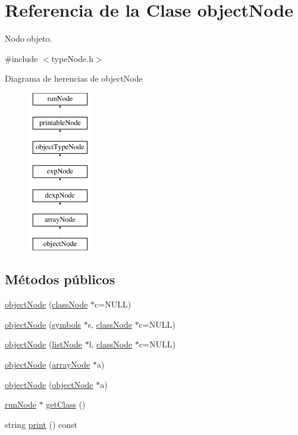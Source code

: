 \hypertarget{classobjectNode}{\section{Referencia de la Clase object\-Node}
\label{classobjectNode}
}


Nodo objeto.  




{\ttfamily \#include $<$type\-Node.\-h$>$}

Diagrama de herencias de object\-Node\begin{figure}[H]
\begin{center}
\leavevmode
\includegraphics[height=7.000000cm]{classobjectNode}
\end{center}
\end{figure}
\subsection*{Métodos públicos}
\begin{DoxyCompactItemize}
\item 
\hyperlink{classobjectNode_a924c50a260e1e237d2f878ff1bd0841d}{object\-Node} (\hyperlink{classclassNode}{class\-Node} $\ast$c=N\-U\-L\-L)
\item 
\hyperlink{classobjectNode_a10c1b39302a06372c2bace771503d716}{object\-Node} (\hyperlink{classsymbolsTable}{symbols} $\ast$s, \hyperlink{classclassNode}{class\-Node} $\ast$c=N\-U\-L\-L)
\item 
\hyperlink{classobjectNode_a4dbc45b00f1d165aabfdcb11d392209d}{object\-Node} (\hyperlink{classlistNode}{list\-Node} $\ast$l, \hyperlink{classclassNode}{class\-Node} $\ast$c=N\-U\-L\-L)
\item 
\hyperlink{classobjectNode_af455d01c22c12c41a7623212658f0a1b}{object\-Node} (\hyperlink{classarrayNode}{array\-Node} $\ast$a)
\item 
\hyperlink{classobjectNode_aefa62a54f0a0b568c864d17cad540a69}{object\-Node} (\hyperlink{classobjectNode}{object\-Node} $\ast$a)
\item 
\hyperlink{classrunNode}{run\-Node} $\ast$ \hyperlink{classobjectNode_a09303f23cd355cf6c404db07f0b4428c}{get\-Class} ()
\item 
string \hyperlink{classobjectNode_a6e191a70f60856612791b319b62461f9}{print} () const 
\end{DoxyCompactItemize}
